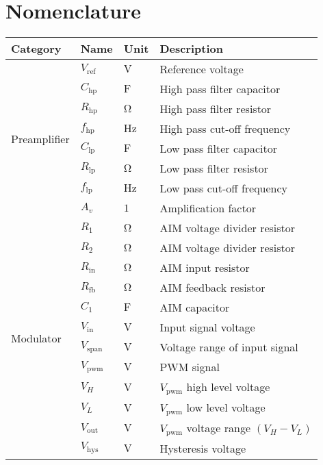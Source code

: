 \chapter*{Nomenclature} \label{cha:denotation}

\begin{longtable}{@{}llll@{}}
	\toprule
	\textbf{Category } & \textbf{Name}    & \textbf{Unit}        & \textbf{Description} \\ \midrule
	\endhead
	\multirow{8}{*}{Preamplifier}       & $V_{\mathrm{ref}}$ & $\si{\volt}$ & Reference voltage \\
	& $C_{\mathrm{hp}}$ & $\si{\farad}$ & High pass filter capacitor \\
	& $R_{\mathrm{hp}}$ & $\si{\ohm}$ & High pass filter resistor \\
	& $f_{\mathrm{hp}}$ & $\si{\hertz}$ & High pass cut-off frequency \\
	& $C_{\mathrm{lp}}$ & $\si{\farad}$ & Low pass filter capacitor \\
	& $R_{\mathrm{lp}}$ & $\si{\ohm}$ & Low pass filter resistor \\
	& $f_{\mathrm{lp}}$ & $\si{\hertz}$ & Low pass cut-off frequency \\
	& $A_{v}$ & $1$ & Amplification factor \\ \midrule
	\multirow{27}{*}{Modulator} & $R_{1}$ & $\si{\ohm}$ & AIM voltage divider resistor \\
	& $R_{2}$ & $\si{\ohm}$ & AIM voltage divider resistor \\
	& $R_{\mathrm{in}}$ & $\si{\ohm}$ & AIM input resistor \\
	& $R_{\mathrm{fb}}$ & $\si{\ohm}$ & AIM feedback resistor \\
	& $C_{1}$ & $\si{\farad}$ & AIM capacitor \\
	& $V_{\mathrm{in}}$ & $\si{\volt}$ & Input signal voltage \\
	& $V_{\mathrm{span}}$ & $\si{\volt}$ & Voltage range of input signal \\ %
	& $V_{\mathrm{pwm}}$ & $\si{\volt}$ & PWM signal \\
	& $V_{H}$ & $\si{\volt}$ & $V_{\mathrm{pwm}}$ high level voltage \\
	& $V_{L}$ & $\si{\volt}$ & $V_{\mathrm{pwm}}$ low level voltage \\
	& $V_{\mathrm{out}}$ & $\si{\volt}$ & $V_{\mathrm{pwm}}$ voltage range $\left( V_{H} - V_{L} \right) $ \\
	& $V_{\mathrm{hys}}$ & $\si{\volt}$ & Hysteresis voltage \\

\end{longtable}
